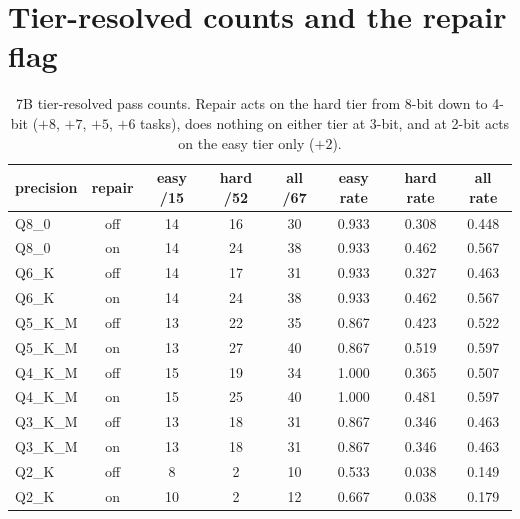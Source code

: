 \documentclass[11pt]{article}
\begin{document}
\FloatBarrier
\Needspace*{0.45\textheight}
\section{Tier-resolved counts and the repair flag}
\label{app:split}

\begin{table}[h]
\centering\small
\caption{7B tier-resolved pass counts. Repair acts on the hard tier from 8-bit down to 4-bit ($+8$, $+7$, $+5$, $+6$ tasks), does nothing on either tier at 3-bit, and at 2-bit acts on the easy tier only ($+2$).}
\label{tab:split7b}
\begin{tabular}{lccccccc}
\toprule
precision & repair & easy /15 & hard /52 & all /67 & easy rate & hard rate & all rate \\
\midrule
Q8\_0   & off & 14 & 16 & 30 & 0.933 & 0.308 & 0.448 \\
Q8\_0   & on  & 14 & 24 & 38 & 0.933 & 0.462 & 0.567 \\
Q6\_K   & off & 14 & 17 & 31 & 0.933 & 0.327 & 0.463 \\
Q6\_K   & on  & 14 & 24 & 38 & 0.933 & 0.462 & 0.567 \\
Q5\_K\_M & off & 13 & 22 & 35 & 0.867 & 0.423 & 0.522 \\
Q5\_K\_M & on  & 13 & 27 & 40 & 0.867 & 0.519 & 0.597 \\
Q4\_K\_M & off & 15 & 19 & 34 & 1.000 & 0.365 & 0.507 \\
Q4\_K\_M & on  & 15 & 25 & 40 & 1.000 & 0.481 & 0.597 \\
Q3\_K\_M & off & 13 & 18 & 31 & 0.867 & 0.346 & 0.463 \\
Q3\_K\_M & on  & 13 & 18 & 31 & 0.867 & 0.346 & 0.463 \\
Q2\_K   & off & 8  & 2  & 10 & 0.533 & 0.038 & 0.149 \\
Q2\_K   & on  & 10 & 2  & 12 & 0.667 & 0.038 & 0.179 \\
\bottomrule
\end{tabular}
\end{table}
\end{document}
